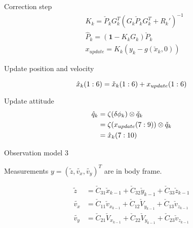 \documentclass{cisXXX} %
\begin{document}
Correction step
\begin{equation}
\begin{split}
&K_k = \check{P}_k G_k^T\left(G_k\check{P}_k G_k^T + R_k'\right)^{-1}   \\
&\hat{P}_k  = (\bm{1}-K_k G_k)\check{P}_k  \\
&x_{update} = K_k(y_k-g(\check{x}_k,0)) 
\end{split}
\end{equation}

Update position and velocity

\begin{equation}
\hat{x}_k\small{(1:6)} = \check{x}_k\small{(1:6)}+x_{update}\small{(1:6)}
\end{equation}

Update attitude
\begin{equation}
\begin{split}
\hat{q}_k &= \zeta(\delta \phi_k)\otimes \check{q}_k    \\
		  &= \zeta(x_{update}\tiny{(7:9)})\otimes \check{q}_k  \\
		  &= \hat{x}_k\small{(7:10)}
\end{split}
\end{equation}

\newpage
Observation model $3$

Measurements $y=(\tilde{z}, \tilde{v_x}, \tilde{v_y})^T$ are in body frame.

\begin{equation}
\begin{split}
\tilde{z} &= \check{C}_{31}\check{x}_{k-1}+\check{C}_{32}\check{y}_{k-1}+\check{C}_{33}\check{z}_{k-1}   \\
\tilde{v_x} &= \check{C}_{11}\check{v}_{x_{k-1}}+\check{C}_{12}\check{V}_{y_{k-1}}+\check{C}_{13}\check{v}_{z_{k-1}}    \\
\tilde{v_y} &= \check{C}_{21}\check{V}_{x_{k-1}}+\check{C}_{22}\check{V}_{y_{k-1}}+\check{C}_{23}\check{v}_{z_{k-1}}
\end{split}
\end{equation}
\end{document}
